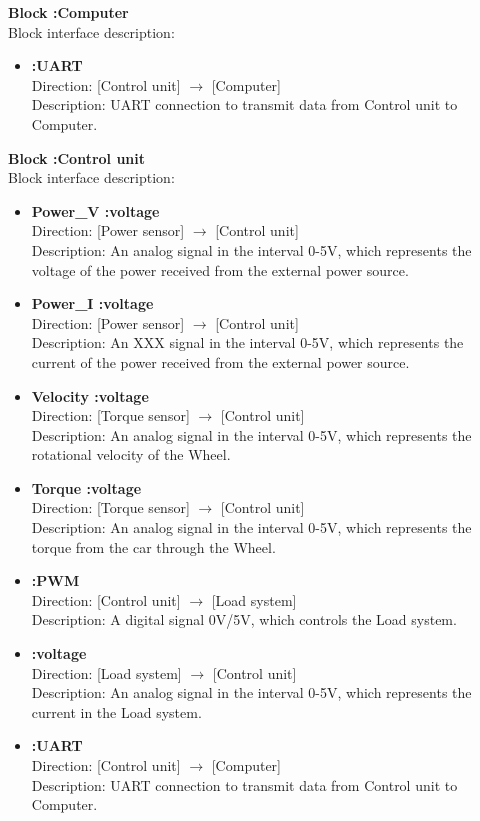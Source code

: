 \textbf{Block :Computer}\\
Block interface description:

\begin{itemize}
	\item \textbf{:UART}\\
		Direction: [Control unit] $\rightarrow$ [Computer]\\
		Description: UART connection to transmit data from Control unit to Computer.
\end{itemize}

\textbf{Block :Control unit}\\
Block interface description:

\begin{itemize}
	\item \textbf{Power\_V :voltage}\\
		Direction: [Power sensor] $\rightarrow$ [Control unit]\\
		Description: An analog signal in the interval 0-5V, which represents the voltage of the power received from the external power source.
	\item \textbf{Power\_I :voltage}\\
		Direction: [Power sensor] $\rightarrow$ [Control unit]\\
		Description: An XXX  signal in the interval 0-5V, which represents the current of the power received from the external power source.
	\item \textbf{Velocity :voltage}\\
		Direction: [Torque sensor] $\rightarrow$ [Control unit]\\
		Description: An analog signal in the interval 0-5V, which represents the rotational velocity of the Wheel.
	\item \textbf{Torque :voltage}\\
		Direction: [Torque sensor] $\rightarrow$ [Control unit]\\
		Description: An analog signal in the interval 0-5V, which represents the torque from the car through the Wheel.
	\item \textbf{:PWM}\\
		Direction: [Control unit] $\rightarrow$ [Load system]\\
		Description: A digital signal 0V/5V, which controls the Load system.
	\item \textbf{:voltage}\\
		Direction: [Load system] $\rightarrow$ [Control unit]\\
		Description: An analog signal in the interval 0-5V, which represents the current in the Load system.
	\item \textbf{:UART}\\
		Direction: [Control unit] $\rightarrow$ [Computer]\\
		Description: UART connection to transmit data from Control unit to Computer.
\end{itemize}